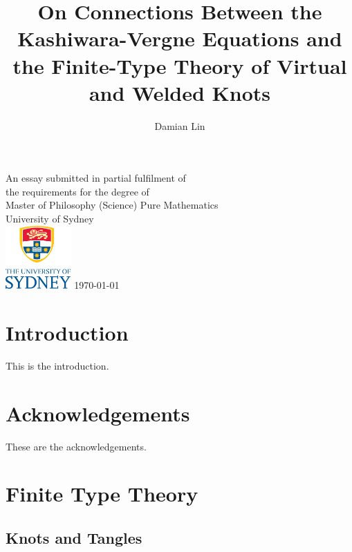 \documentclass[12pt]{report}
\theoremstyle{upright}
\begin{document}
	
	
	\author{Damian Lin}
	\title{On Connections Between the Kashiwara-Vergne Equations and the Finite-Type Theory of Virtual and Welded Knots}
	
	\cleardoublepage \thispagestyle{empty}
	\null \vfil
	\begingroup
	\LARGE \bfseries \centering
	\openup \medskipamount
	\thetitle \par \vspace{30pt}
	\centering \mdseries \theauthor \par \bigskip
	\endgroup
	\vfil \vfil \vfil
	\begin{center}
		An essay submitted in partial fulfilment of\\
		the requirements for the degree of\\
		Master of Philosophy (Science)
		\vfil\vfil
		{\large Pure Mathematics\\[5pt]
			University of Sydney}\\
		\vskip6mm
		\includegraphics[width=25mm]{graphics/USY_MB1_CMYK_Stacked_Logo}
		\vfil
		\normalsize\today
	\end{center}
	\vfil
	\cleardoublepage
	
	\tableofcontents
	
	\chapter*{Introduction}
	
	This is the introduction.
	
	
	\chapter*{Acknowledgements}
	
	These are the acknowledgements.
	
	
	\chapter{Finite Type Theory}
	
	\section{Knots and Tangles}
\end{document}

